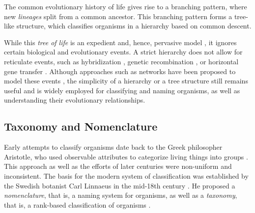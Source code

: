 The common evolutionary history of life gives rise to a branching pattern,
where new \emph{lineages} split from a common ancestor.
This branching pattern forms a tree-like structure,
which classifies organisms in a hierarchy based on common descent.

While this \emph{tree of life} is an expedient and, hence, pervasive model \cite{Mindell2013,Hug2016},
it ignores certain biological and evolutionary events.
A strict hierarchy does not allow for reticulate events,
such as hybridization \cite{Maddison1997a}, genetic recombination \cite{Hein1993},
or horizontal gene transfer \cite{Ochman2000,DunningHotopp2011,Robinson2013}.
Although approaches such as networks have been proposed to model these events \cite{Cardona2008a,Huson2011a},
the simplicity of a hierarchy or a tree structure still remains useful and
is widely employed for classifying and naming organisms, as well as understanding their evolutionary relationships.





\subsection{Taxonomy and Nomenclature}
\label{ch:Foundations:sec:TreeOfLife:sub:TaxonomyNomenclature}

Early attempts to classify organisms date back to the Greek philosopher Aristotle,
who used observable attributes to categorize living things into groups \cite{Leroi2014}.
This approach as well as the efforts of later centuries were non-uniform and inconsistent.
The basis for the modern system of classification was established
by the Swedish botanist Carl Linnaeus in the mid-18th century \cite{Donk1957}.
He proposed a \emph{nomenclature}, that is, a naming system for organisms,
as well as a \emph{taxonomy}, that is, a rank-based classification of organisms \cite{Linnaeus1735,Linnaeus1753}.

